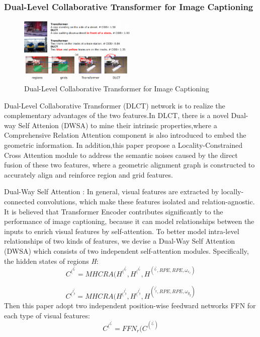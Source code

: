 \documentclass[xelatex,a4j,10pt,twocolumn]{article}
\begin{document}
\subsubsection{Dual-Level Collaborative Transformer for Image Captioning}
\begin{figure}[h]
	\centering
    \includegraphics[width=0.5\textwidth]{7.png}    
 	\caption{Dual-Level Collaborative Transformer for Image Captioning}
 	\label{fig:7}
\end{figure}
Dual-Level Collaborative Transformer (DLCT) network\cite{5DLCT} is to realize the complementary advantages of the two features.In DLCT, there is a novel Dual-way Self Attenion (DWSA) to mine their intrinsic properties,where a Comprehensive Relation Attention component is also introduced to embed the geometric information. In addition,this paper propose a Locality-Constrained Cross Attention module to address the semantic noises caused by the direct fusion of these two features, where a geometric alignment graph is constructed to accurately align and reinforce region and grid features.

Dual-Way Self Attention : In general, visual features are
extracted by locally-connected convolutions, which make these features isolated and relation-agnostic. It is believed that Transformer Encoder contributes significantly to the performance
of image captioning, because it can model relationships between the inputs to enrich visual features by self-attention.
To better model intra-level relationships of two kinds of features, we devise a Dual-Way Self Attention (DWSA) which
consists of two independent self-attention modules.
Specifically, the hidden states of regions \textit{H}:
\begin{equation}
    C^(^l^) _r = MHCRA(H^(^l^) _r,H^(^l^) _r,H^(^l^) _r,RPE,RPE,\omega_r_r)
\end{equation}

\begin{equation}
    C^(^l^) _g = MHCRA(H^(^l^) _g,H^(^l^) _g,H^(^l^) _g,RPE,RPE,\omega_g_g)
\end{equation}
Then this paper adopt two independent position-wise feedward networks FFN for each type of visual features:
\begin{equation}
    C^(^l^) _r = FFN_r( C^(^l^) _r)
\end{equation}
\end{document}
